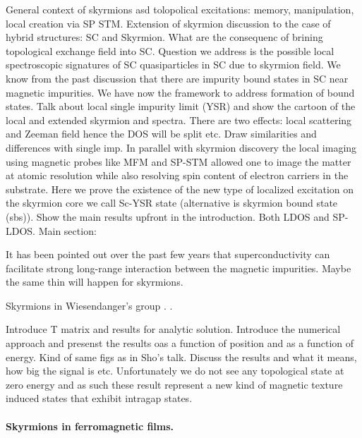 \documentclass[twocolumn,showpacs,floatfix,nofootinbib,longbibliography]{revtex4-1}
\begin{document}
General context of skyrmions asd tolopolical excitations: memory, manipulation, local creation via SP STM.
Extension of skyrmion discussion to the case of hybrid structures: SC and Skyrmion. What are the consequenc of brining topological exchange field into SC. Question we address is the possible local spectroscopic signatures of SC quasiparticles in SC due to skyrmion field. We know from the past discussion that there are impurity bound states in SC near magnetic impurities. We have now the framework to address formation of bound states. Talk about local single impurity limit (YSR) and show the cartoon of the local and extended skyrmion and spectra. There are two effects: local scattering and Zeeman field hence the DOS will be split etc.  Draw similarities and differences with single imp.
In parallel with skyrmion discovery the local imaging using magnetic probes like MFM and SP-STM allowed one to image the matter at atomic resolution while also resolving spin content of electron carriers in the substrate.  
Here we prove the existence of the new type of localized excitation on the skyrmion core we call  Sc-YSR state (alternative is skyrmion bound state (sbs)).  Show the main results upfront in the introduction. Both LDOS and SP-LDOS. 
Main section: 

It has been pointed out over the past few years that superconductivity can facilitate strong long-range interaction between the magnetic impurities. Maybe the same thin will happen for skyrmions. 

Skyrmions in Wiesendanger's group \cite{Heinze2011,Romming2013,Bergmann2014,Brede2014,Sonntag2014,vonBergmann2015,Romming2015}.
.


Introduce T matrix and results for analytic solution.  
Introduce the numerical approach and presenst the results oas a function of position and as a function of energy. Kind of same figs as in Sho’s talk. 
Discuss the results and what it means, how big the signal is etc. Unfortunately we do not see any topological state at zero energy and as such these result represent a new kind of magnetic texture induced states that exhibit intragap states.



\paragraph*{Skyrmions in ferromagnetic films.} \label{sec:skyrmion}
\end{document}
